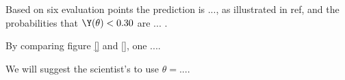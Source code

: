Based on six evaluation points the prediction is ..., as illustrated in ref{}, and the probabilities that $\Y(\theta) < 0.30$ are ... .

By comparing figure \ref{} and \ref{}, one .... 

We will suggest the scientist's to use $\theta = ... $. 
